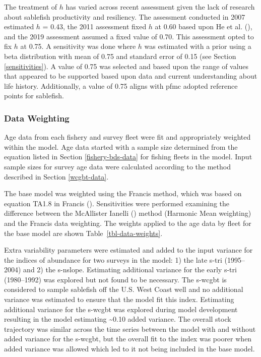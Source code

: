 \documentclass[
  english,
]{article}
\begin{document}
The treatment of \(h\) has varied across recent assessment given the
lack of research about sablefish productivity and resiliency. The
assessment conducted in 2007 estimated \(h\) = 0.43, the 2011 assessment
fixed \(h\) at 0.60 based upon He et al.
(), and the 2019 assessment assumed a
fixed value of 0.70. This assessment opted to fix \(h\) at 0.75. A
sensitivity was done where \(h\) was estimated with a prior using a beta
distribution with mean of 0.75 and standard error of 0.15 (see Section
\ref{sensitivities}). A value of 0.75 was selected and based upon the
range of values that appeared to be supported based upon data and
current understanding about life history. Additionally, a value of 0.75
aligns with \gls{pfmc} adopted reference points for sablefish.

\subsubsection{Data Weighting}\label{data-weighting}

Age data from each fishery and survey fleet were fit and appropriately
weighted within the model. Age data started with a sample size
determined from the equation listed in Section \ref{fishery-bds-data}
for fishing fleets in the model. Input sample sizes for survey age data
were calculated according to the method described in Section
\ref{wcgbt-data}.

The base model was weighted using the Francis method, which was based on
equation TA1.8 in Francis (). Sensitivities were performed examining the difference between
the McAllister Ianelli
()
method (Harmonic Mean weighting) and the Francis data weighting. The
weights applied to the age data by fleet for the base model are shown
Table~\ref{tbl-data-weights}.

Extra variability parameters were estimated and added to the input
variance for the indices of abundance for two surveys in the model: 1)
the late \gls{s-tri} (1995--2004) and 2) the \gls{s-nslope}. Estimating
additional variance for the early \gls{s-tri} (1980--1992) was explored
but not found to be necessary. The \gls{s-wcgbt} is considered to sample
sablefish off the U.S. West Coast well and no additional variance was
estimated to ensure that the model fit this index. Estimating additional
variance for the \gls{s-wcgbt} was explored during model development
resulting in the model estimating \textasciitilde0.10 added variance.
The overall stock trajectory was similar across the time series between
the model with and without added variance for the \gls{s-wcgbt}, but the
overall fit to the index was poorer when added variance was allowed
which led to it not being included in the base model.
\end{document}
